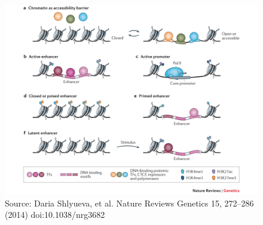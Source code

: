 \documentclass[slidestop,compress,11pt,xcolor=dvipsnames]{beamer}
\begin{document}
\begin{frame}[plain]%
 \vspace*{-0.3cm}
\begin{figure}
 \centering
 \includegraphics[width=1.05\linewidth]{intro/marks.pdf}{\tiny{\\Source: Daria Shlyueva, et al. Nature Reviews Genetics 15, 272–286 (2014) doi:10.1038/nrg3682}}
\end{figure}
\end{frame}
\end{document}
